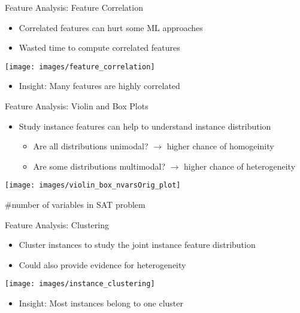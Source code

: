 \begin{frame}[c]{Feature Analysis: Feature Correlation}

\begin{itemize}
  \item Correlated features can hurt some ML approaches
  \item Wasted time to compute correlated features
\end{itemize}

\centering
\texttt{[image: images/feature\_correlation]}

\pause
\smallskip

\begin{itemize}
  \item \alert{Insight:} Many features are highly correlated
\end{itemize}

\end{frame}
\begin{frame}[c]{Feature Analysis: Violin and Box Plots}

\begin{itemize}
  \item Study instance features can help to understand instance distribution
  \begin{itemize}
    \item Are all distributions unimodal? $\to$ higher chance of homogeinity 
    \item Are some distributions multimodal? $\to$ higher chance of heterogeneity 
  \end{itemize}
\end{itemize}

\centering
\texttt{[image: images/violin\_box\_nvarsOrig\_plot]}

\#number of variables in SAT problem

\end{frame}
\begin{frame}[c]{Feature Analysis: Clustering}

\begin{itemize}
  \item Cluster instances to study the joint instance feature distribution
  \item Could also provide evidence for heterogeneity
\end{itemize}

\centering
\texttt{[image: images/instance\_clustering]}

\pause
\smallskip

\begin{itemize}
  \item \alert{Insight:} Most instances belong to one cluster
\end{itemize}

\end{frame}
